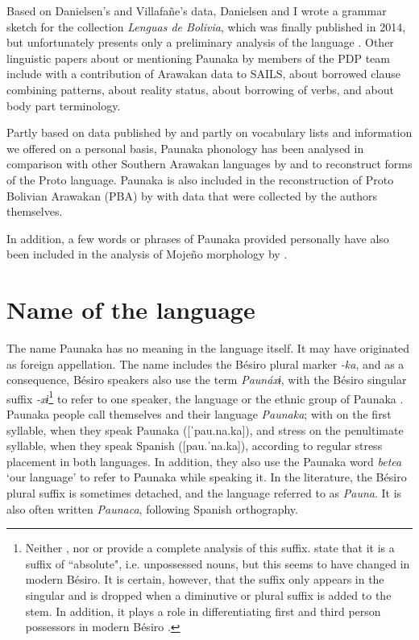 Based on Danielsen’s and Villafañe’s data, Danielsen and I wrote a grammar sketch for the collection \textit{Lenguas de Bolivia}, which was finally published in 2014, but unfortunately presents only a preliminary analysis of the language \citep[cf.][]{DanielsenTerhart2014}. Other linguistic papers about or mentioning Paunaka by members of the PDP team include \citet[]{Danielsen2014} with a contribution of Arawakan data to SAILS, \citet[]{DanielsenTerhart2015} about borrowed clause combining patterns, \citet[]{DanielsenTerhartSubm} about reality status, \citet[]{Terhart_subm} about borrowing of verbs, and \citet[]{TerhartDanielsenBODY} about body part terminology.

Partly based on data published by \citet[]{DanielsenTerhart2014} and partly on vocabulary lists and information we offered on a personal basis, Paunaka phonology has been analysed in comparison with other Southern Arawakan languages by \citet[]{Jolkesky2016} and \citet[]{deCarvalhoPAU} to reconstruct forms of the Proto language. Paunaka is also included in the reconstruction of Proto Bolivian Arawakan (PBA) by \citet[]{RamirezFranca2019} with data that were collected by the authors themselves.

In addition, a few words or phrases of Paunaka provided personally have also been included in the analysis of Mojeño morphology by \citet[]{Rose2015a,Rose2018}.


\section{Name of the language}\label{sec:Name}
The name Paunaka has no meaning in the language itself. It may have originated as foreign appellation. The name includes the Bésiro plural marker \textit{-ka}, and as a consequence, Bésiro speakers also use the term \textit{Paunáxɨ}, with the Bésiro singular suffix \textit{-xɨ}\footnote{Neither \citet[]{Sans2013}, nor \citet[]{Galeote2014} or \citet[]{Adelaar2004} provide a complete analysis of this suffix. \citet[8]{AdamHenry1880} state that it is a suffix of “absolute", i.e. unpossessed nouns, but this seems to have changed in modern Bésiro. It is certain, however, that the suffix only appears in the singular and is dropped when a diminutive or plural suffix is added to the stem. In addition, it plays a role in differentiating first and third person possessors in modern Bésiro \citep[20, 23]{Sans2013}.} to refer to one speaker, the language or the ethnic group of Paunaka \citep[cf.][9]{Villalta2013}. Paunaka people call themselves and their language \textit{Paunaka}; with  on the first syllable, when they speak Paunaka ([ˈpau.na.ka]), and stress on the penultimate syllable, when they speak Spanish ([pau.ˈna.ka]), according to regular stress placement in both languages. In addition, they also use the Paunaka word \textit{betea} ‘our language’ to refer to Paunaka while speaking it. In the literature, the Bésiro plural suffix is sometimes detached, and the language referred to as \textit{Pauna}. It is also often written \textit{Paunaca}, following Spanish orthography. 

